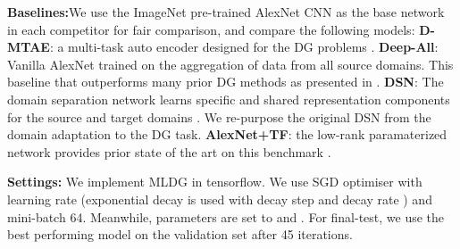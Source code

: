 \documentclass[letterpaper]{article} \usepackage{aaai18}  \usepackage{times}  \usepackage{helvet}  \usepackage{courier}  \usepackage{url}  \usepackage{graphicx}  \usepackage{amsmath}
\newcommand{\keypoint}[1]{\vspace{0.1cm}\noindent\textbf{#1}\quad}
\begin{document}
{\vspace{0.1cm}\noindent \textbf{Baselines:}\quad We use the ImageNet pre-trained AlexNet CNN \cite{krizhevsky2012imagenetDeepCNN} as the base network in each competitor for fair comparison, and compare the following models: \textbf{D-MTAE}: a multi-task auto encoder designed for the DG problems \cite{ghifary2015domain}. \textbf{Deep-All}: Vanilla AlexNet trained on the aggregation of data from all source domains. This baseline that outperforms many prior DG methods as presented in  \cite{da2017dg}. 
\textbf{DSN}: The domain separation network learns specific and shared representation components for the source and target domains \cite{bousmalis2016domain}. We re-purpose the original DSN from the domain adaptation to the DG task. \textbf{AlexNet+TF}: the low-rank paramaterized network provides prior state of the art on this benchmark \cite{da2017dg}. 




\keypoint{Settings:} We implement MLDG in tensorflow. We use SGD optimiser with learning rate  (exponential decay is used with decay step  and decay rate ) and mini-batch 64. 
Meanwhile, parameters  are set to  and . For final-test, we use the best performing model on the validation set after 45 iterations.

\begin{table*}[t]
\centering
\caption{Cross-domain recognition accuracy (Multi-class accuracy) on the PACS dataset. Best performance in bold.}
\label{pacs}
\end{table*}

}
\end{document}
